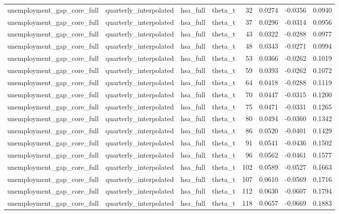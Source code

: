 \begin{tabular}{llllrrrr}
unemployment\_gap\_core\_full & quarterly\_interpolated & hsa\_full & theta\_t & 32 & 0.0274 & -0.0356 & 0.0940 \\
unemployment\_gap\_core\_full & quarterly\_interpolated & hsa\_full & theta\_t & 37 & 0.0296 & -0.0314 & 0.0956 \\
unemployment\_gap\_core\_full & quarterly\_interpolated & hsa\_full & theta\_t & 43 & 0.0322 & -0.0288 & 0.0977 \\
unemployment\_gap\_core\_full & quarterly\_interpolated & hsa\_full & theta\_t & 48 & 0.0343 & -0.0271 & 0.0994 \\
unemployment\_gap\_core\_full & quarterly\_interpolated & hsa\_full & theta\_t & 53 & 0.0366 & -0.0262 & 0.1019 \\
unemployment\_gap\_core\_full & quarterly\_interpolated & hsa\_full & theta\_t & 59 & 0.0393 & -0.0262 & 0.1072 \\
unemployment\_gap\_core\_full & quarterly\_interpolated & hsa\_full & theta\_t & 64 & 0.0418 & -0.0288 & 0.1119 \\
unemployment\_gap\_core\_full & quarterly\_interpolated & hsa\_full & theta\_t & 70 & 0.0447 & -0.0315 & 0.1200 \\
unemployment\_gap\_core\_full & quarterly\_interpolated & hsa\_full & theta\_t & 75 & 0.0471 & -0.0331 & 0.1265 \\
unemployment\_gap\_core\_full & quarterly\_interpolated & hsa\_full & theta\_t & 80 & 0.0494 & -0.0360 & 0.1342 \\
unemployment\_gap\_core\_full & quarterly\_interpolated & hsa\_full & theta\_t & 86 & 0.0520 & -0.0401 & 0.1429 \\
unemployment\_gap\_core\_full & quarterly\_interpolated & hsa\_full & theta\_t & 91 & 0.0541 & -0.0436 & 0.1502 \\
unemployment\_gap\_core\_full & quarterly\_interpolated & hsa\_full & theta\_t & 96 & 0.0562 & -0.0461 & 0.1577 \\
unemployment\_gap\_core\_full & quarterly\_interpolated & hsa\_full & theta\_t & 102 & 0.0589 & -0.0527 & 0.1663 \\
unemployment\_gap\_core\_full & quarterly\_interpolated & hsa\_full & theta\_t & 107 & 0.0610 & -0.0569 & 0.1716 \\
unemployment\_gap\_core\_full & quarterly\_interpolated & hsa\_full & theta\_t & 112 & 0.0630 & -0.0607 & 0.1794 \\
unemployment\_gap\_core\_full & quarterly\_interpolated & hsa\_full & theta\_t & 118 & 0.0657 & -0.0669 & 0.1883 \\

\end{tabular}
